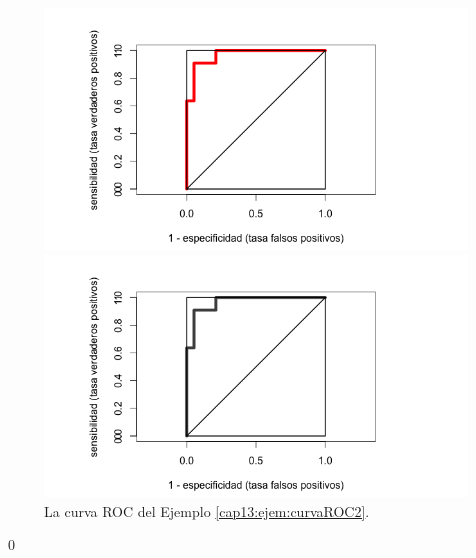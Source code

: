 \begin{ejemplo}
\begin{figure}[bth]
\begin{center}
\begin{enColor}
\includegraphics[width=13cm]{../fig/Cap13-CurvaROCvasculopatia.png}
\end{enColor}
\begin{bn}
\includegraphics[width=13cm]{../fig/Cap13-CurvaROCvasculopatia-bn.png}
\end{bn}
\caption{La curva ROC del Ejemplo \ref{cap13:ejem:curvaROC2}. }
\label{cap13:fig:curvaROCVasculopatia}
\end{center}
\end{figure}
\qed
\end{ejemplo}

